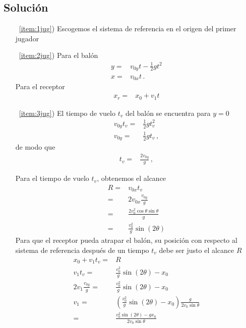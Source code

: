 \subsection*{Solución}
  \begin{itemize}
  \item[~\ref{item:1jug})] Escogemos el sistema de referencia en el origen del primer jugador
  \item[~\ref{item:2jug})] Para el balón
    \begin{align*}
      y=&v_{0y}t-\frac{1}{2}gt^2\nonumber\\
      x=&v_{0x}t\,.
    \end{align*}
    Para el receptor
    \begin{align*}
      x_r=&x_0+v_1 t
    \end{align*}
  \item[~\ref{item:3jug})]
    El tiempo de vuelo $t_v$ del balón se encuentra para $y=0$
    \begin{align*}
      v_{0y}t_v=&\frac{1}{2}gt_v^2\nonumber\\
      v_{0y}=&\frac{1}{2}gt_v\,,
    \end{align*}
    de modo que
    \begin{align}
      \label{eq:tv}
      t_v=&\frac{2v_{0y}}{g}\,,
    \end{align}

    Para el tiempo de vuelo $t_v$, obtenemos el alcance
    \begin{align}
      \label{eq:13}
      R=&v_{0x}t_v \nonumber\\
       =&2 v_{0x}\frac{v_{0y}}{g} \nonumber\\
       =&\frac{2 v_{0}^2\cos\theta\sin\theta}{g} \nonumber\\
       =&\frac{v_0^2}{g}\sin(2\theta)
    \end{align}
    Para que el receptor pueda atrapar el balón, su posición con respecto al sistema de referencia después de un tiempo $t_v$ debe ser justo el alcance $R$
    \begin{align*}
      x_0+v_1 t_v=&R\nonumber\\
      v_1 t_v=&\frac{v_0^2}{g}\sin(2\theta)-x_0\nonumber\\
      2 v_1 \frac{v_{0y}}{g}=&\frac{v_0^2}{g}\sin(2\theta)-x_0\nonumber\\
      v_1 =&\left( \frac{v_0^2}{g}\sin(2\theta)-x_0 \right) \frac{g}{2v_0\sin\theta}\nonumber\\
      =&\frac{v_0^2\sin(2\theta)-gx_0}{2v_0\sin\theta}\nonumber\\
    \end{align*}


\end{itemize}
